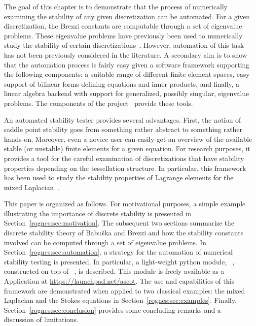 The goal of this chapter is to demonstrate that the process of
numerically examining the stability of any given discretization can be
automated. For a given discretization, the Brezzi constants are
computable through a set of eigenvalue problems. These eigenvalue
problems have previously been used to numerically study the stability
of certain discretizations~\cite{ArnoldRognes2009, ChapelleBathe1993,
  Qin1994}. However, automation of this task has not been previously
considered in the literature. A secondary aim is to show that the
automation process is fairly easy given a software framework
supporting the following components: a suitable range of different
finite element spaces, easy support of bilinear forms defining
equations and inner products, and finally, a linear algebra backend
with support for generalized, possibly singular, eigenvalue
problems. The components of the \fenics{} project~\cite{www:fenics}
provide these tools.

An automated stability tester provides several advantages. First, the
notion of saddle point stability goes from something rather abstract
to something rather hands-on. Moreover, even a novice user can easily
get an overview of the available stable (or unstable) finite elements
for a given equation. For research purposes, it provides a tool for
the careful examination of discretizations that have stability
properties depending on the tessellation structure. In particular,
this framework has been used to study the stability properties of
Lagrange elements for the mixed Laplacian~\cite{ArnoldRognes2009}.

This paper is organized as follows. For motivational purposes, a
simple example illustrating the importance of discrete stability is
presented in Section~\ref{rognes:sec:motivation}. The subsequent two
sections summarize the discrete stability theory of Babu\v ska and
Brezzi and how the stability constants involved can be computed
through a set of eigenvalue problems. In
Section~\ref{rognes:sec:automation}, a strategy for the automation of
numerical stability testing is presented. In particular, a
light-weight python module, \rognesascot{}~\cite{Rognes2009},
constructed on top of \pydolfin{}~\cite{LoggWells2010}, is
described. This module is freely available as a \fenics{} Application
at \url{https://launchpad.net/ascot}. The use and capabilities of this
framework are demonstrated when applied to two classical examples: the
mixed Laplacian and the Stokes equations in
Section~\ref{rognes:sec:examples}. Finally,
Section~\ref{rognes:sec:conclusion} provides some concluding remarks
and a discussion of limitations.

